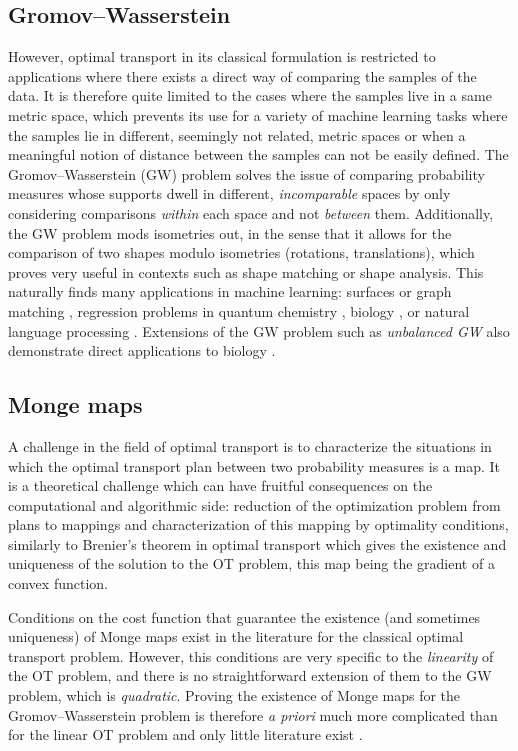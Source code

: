\subsection*{Gromov--Wasserstein}
However, optimal transport in its classical formulation is restricted to applications where there exists a direct way of comparing the samples of the data. It is therefore quite limited to the cases where the samples live in a same metric space, which prevents its use for a variety of machine learning tasks where the samples lie in different, seemingly not related, metric spaces or when a meaningful notion of distance between the samples can not be easily defined. The Gromov--Wasserstein (GW) problem \cite{memoli2011gromov} solves the issue of comparing probability measures whose supports dwell in different, \emph{incomparable} spaces by only considering comparisons \emph{within} each space and not \emph{between} them. Additionally, the GW problem mods isometries out, in the sense that it allows for the comparison of two shapes modulo isometries (rotations, translations), which proves very useful in contexts such as shape matching or shape analysis.
This naturally finds many applications in machine learning: surfaces \cite{bronstein2006generalized} or graph matching \cite{xu2019scalable}, regression problems in quantum chemistry \cite{gilmer2017neural}, biology \cite{demetci2020gromov}, or natural language processing \cite{grave2019unsupervised,alvarez2018gromov}. Extensions of the GW problem such as \emph{unbalanced GW} \cite[Chap.~5]{sejourne2021unbalanced} also demonstrate direct applications to biology \cite{demetcci2022unsupervised}.

\subsection*{Monge maps}
A challenge in the field of optimal transport is to characterize the situations in which the optimal transport plan between two probability measures is a map. It is a theoretical challenge which can have fruitful consequences on the computational and algorithmic side: reduction of the optimization problem from plans to mappings and characterization of this mapping by optimality conditions, similarly to Brenier's theorem \cite{brenier1987decomposition} in optimal transport which gives the existence and uniqueness of the solution to the OT problem, this map being the gradient of a convex function.

Conditions on the cost function that guarantee the existence (and sometimes uniqueness) of Monge maps exist in the literature for the classical optimal transport problem. However, this conditions are very specific to the \emph{linearity} of the OT problem, and there is no straightforward extension of them to the GW problem, which is \emph{quadratic}. Proving the existence of Monge maps for the Gromov--Wasserstein problem is therefore \textit{a priori} much more complicated than for the linear OT problem and only little literature exist \cite{sturm2012space,vayer2020contribution}.

